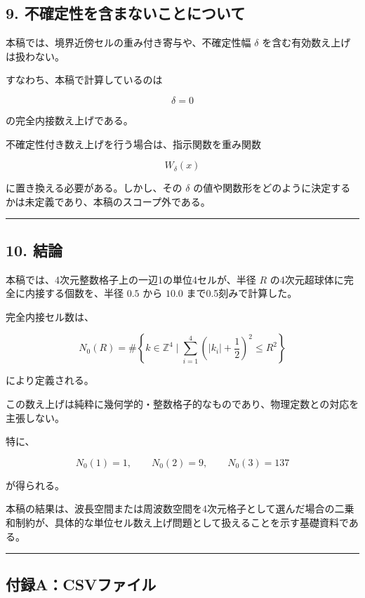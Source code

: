 \documentclass[
]{ltjsarticle}
\begin{document}
\subsection{9.
不確定性を含まないことについて}\label{ux4e0dux78baux5b9aux6027ux3092ux542bux307eux306aux3044ux3053ux3068ux306bux3064ux3044ux3066}

本稿では、境界近傍セルの重み付き寄与や、不確定性幅 \(\delta\)
を含む有効数え上げは扱わない。

すなわち、本稿で計算しているのは

\[
\delta=0
\]

の完全内接数え上げである。

不確定性付き数え上げを行う場合は、指示関数を重み関数

\[
W_\delta(x)
\]

に置き換える必要がある。しかし、その \(\delta\)
の値や関数形をどのように決定するかは未定義であり、本稿のスコープ外である。

\begin{center}\rule{0.5\linewidth}{0.5pt}\end{center}

\subsection{10. 結論}\label{ux7d50ux8ad6}

本稿では、4次元整数格子上の一辺1の単位4セルが、半径 \(R\)
の4次元超球体に完全に内接する個数を、半径 \(0.5\) から \(10.0\)
まで0.5刻みで計算した。

完全内接セル数は、

\[
N_0(R)
=
\#\left\{
k\in\mathbb{Z}^4
\mid
\sum_{i=1}^{4}
\left(|k_i|+\frac12\right)^2
\le R^2
\right\}
\]

により定義される。

この数え上げは純粋に幾何学的・整数格子的なものであり、物理定数との対応を主張しない。

特に、

\[
N_0(1)=1,\qquad
N_0(2)=9,\qquad
N_0(3)=137
\]

が得られる。

本稿の結果は、波長空間または周波数空間を4次元格子として選んだ場合の二乗和制約が、具体的な単位セル数え上げ問題として扱えることを示す基礎資料である。

\begin{center}\rule{0.5\linewidth}{0.5pt}\end{center}

\subsection{付録A：CSVファイル}\label{ux4ed8ux9332acsvux30d5ux30a1ux30a4ux30eb}
\end{document}

